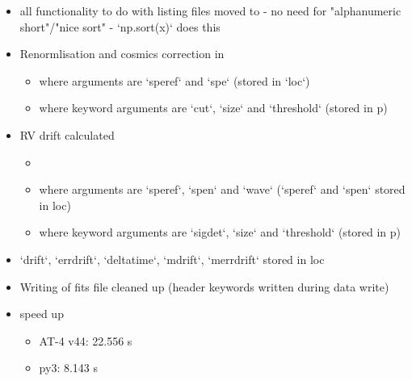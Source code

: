 \begin{itemize}
\item all functionality to do with listing files moved to  - no need for "alphanumeric short"/"nice sort" - `np.sort(x)` does this
    
\item Renormlisation and cosmics correction in 
	\begin{itemize}
	\item where arguments are `speref` and `spe` (stored in `loc`)
	\item where keyword arguments are `cut`, `size` and `threshold` (stored in p)
	\end{itemize}

\item RV drift calculated
	\begin{itemize}
	\item {}
	\item where arguments are `speref`, `spen` and `wave` (`speref` and `spen` stored in loc)
	\item where keyword arguments are `sigdet`, `size` and `threshold` (stored in p)
	\end{itemize}

\item `drift`, `errdrift`, `deltatime`, `mdrift`, `merrdrift` stored in loc

\item Writing of fits file cleaned up (header keywords written during data write)

\item speed up
	\begin{itemize}
	\item AT-4 v44: 22.556 s
	\item py3:  8.143 s
	\end{itemize}

\end{itemize}
